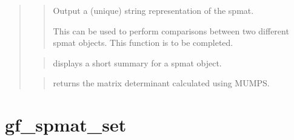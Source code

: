 \documentclass[a4paper,11pt,english]{sphinxmanual}
\begin{document}
\begin{quote}
\begin{quote}
\sphinxAtStartPar
Output a (unique) string representation of the spmat.

\sphinxAtStartPar
This can be used to perform comparisons between two
different spmat objects.
This function is to be completed.
\end{quote}

\sphinxAtStartPar
{}
\begin{quote}

\sphinxAtStartPar
displays a short summary for a spmat object.
\end{quote}

\sphinxAtStartPar
{}
\begin{quote}

\sphinxAtStartPar
returns the matrix determinant calculated using MUMPS.
\end{quote}
\end{quote}


\section{gf\_spmat\_set}
\label{\detokenize{scilab/cmdref_gf_spmat_set:gf-spmat-set}}\label{\detokenize{scilab/cmdref_gf_spmat_set::doc}}
\sphinxAtStartPar
{}
\end{document}
